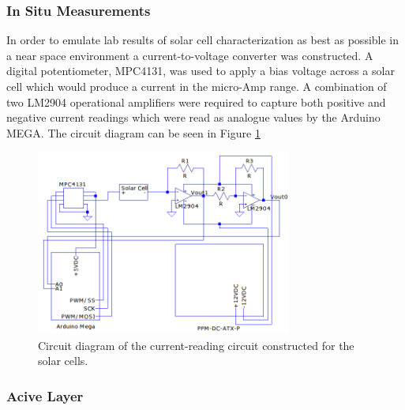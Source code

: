 \subsubsection{In Situ Measurements}

In order to emulate lab results of solar cell characterization as best as possible in a near space environment a current-to-voltage converter was constructed. A digital potentiometer, MPC4131, was used to apply a bias voltage across a solar cell which would produce a current in the micro-Amp range. A combination of two LM2904 operational amplifiers were required to capture both positive and negative current readings which were read as analogue values by the Arduino MEGA. The circuit diagram can be seen in Figure \ref{fig:solar-cell-circuit}

\begin{figure}[h!]
	\begin{center}
		\includegraphics[width=0.75\textwidth]{figures/solar-cell-circuit-diagram.png}
		\caption{Circuit diagram of the current-reading circuit constructed for the solar cells.}
		\label{fig:solar-cell-circuit}
	\end{center}
\end{figure}

\subsubsection{Acive Layer}
	
